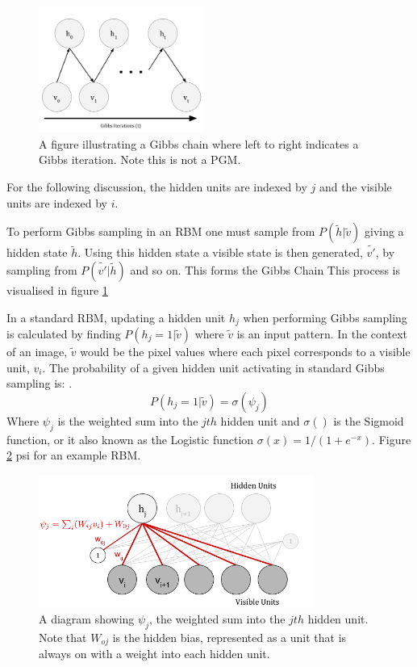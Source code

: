 \begin{figure}
  \begin{center}
    \includegraphics[width=0.48\textwidth]{Assets/Gibbs_Chain.png}
  \end{center}
  \caption{A figure illustrating a Gibbs chain where left to right indicates a Gibbs iteration. Note this is not a PGM.}
  \label{F:Gibbs_Chain}
\end{figure}

For the following discussion, the hidden units are indexed by $j$ and the visible units are indexed by $i$.

To perform Gibbs sampling in an RBM one must sample from $P(\tilde{h}|\tilde{v})$ giving a hidden state $\tilde{h}$. Using this hidden state a visible state is then generated, $\tilde{v'}$, by sampling from $P(\tilde{v'}|\tilde{h})$ and so on. This forms the Gibbs Chain  This process is visualised in figure \ref{F:Gibbs_Chain}

In a standard RBM, updating a hidden unit $h_j$ when performing Gibbs sampling is calculated by finding $ P(h_j = 1 | \tilde{v}) $ where $\tilde{v}$ is an input pattern. In the context of an image, $ \tilde{v} $ would be the pixel values where each pixel corresponds to a visible unit, $v_i$.
The probability of a given hidden unit activating in standard Gibbs sampling is: .
$$
P(h_j = 1 | \tilde{v}) = \sigma(\psi_j)
$$
Where $\psi_j$ is the weighted sum into the $jth$ hidden unit and $\sigma()$ is the Sigmoid function, or it also known as the Logistic function $\sigma(x)=1/(1+e^{-x})$. Figure \ref{F:PSI}  psi for an example RBM.

\begin{figure}[h]
\begin{center}
  \includegraphics[width = 0.8\textwidth]{Assets/PSI_and_PHI.png}
\caption{A diagram showing $\psi_j$, the weighted sum into the $jth$ hidden unit. Note that $W_{oj}$ is the hidden bias, represented as a unit that is always on with a weight into each hidden unit.}
\label{F:PSI}
\end{center}
\end{figure}

